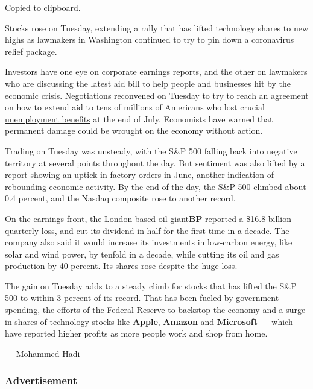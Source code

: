 Copied to clipboard.

Stocks rose on Tuesday, extending a rally that has lifted technology
shares to new highs as lawmakers in Washington continued to try to pin
down a coronavirus relief package.

Investors have one eye on corporate earnings reports, and the other on
lawmakers who are discussing the latest aid bill to help people and
businesses hit by the economic crisis. Negotiations reconvened on
Tuesday to try to reach an agreement on how to extend aid to tens of
millions of Americans who lost crucial
\href{https://www.nytimes3xbfgragh.onion/2020/07/30/business/unemployment-payments-change.html}{unemployment
benefits} at the end of July. Economists have warned that permanent
damage could be wrought on the economy without action.

Trading on Tuesday was unsteady, with the S\&P 500 falling back into
negative territory at several points throughout the day. But sentiment
was also lifted by a report showing an uptick in factory orders in June,
another indication of rebounding economic activity. By the end of the
day, the S\&P 500 climbed about 0.4 percent, and the Nasdaq composite
rose to another record.

On the earnings front, the
\href{https://www.nytimes3xbfgragh.onion/live/2020/08/04/business/stock-market-today-coronavirus/bp-to-step-up-renewable-investment-as-it-reports-a-huge-loss}{London-based
oil
giant}\textbf{\href{https://www.nytimes3xbfgragh.onion/live/2020/08/04/business/stock-market-today-coronavirus/bp-to-step-up-renewable-investment-as-it-reports-a-huge-loss}{BP}}
reported a \$16.8 billion quarterly loss, and cut its dividend in half
for the first time in a decade. The company also said it would increase
its investments in low-carbon energy, like solar and wind power, by
tenfold in a decade, while cutting its oil and gas production by 40
percent. Its shares rose despite the huge loss.

The gain on Tuesday adds to a steady climb for stocks that has lifted
the S\&P 500 to within 3 percent of its record. That has been fueled by
government spending, the efforts of the Federal Reserve to backstop the
economy and a surge in shares of technology stocks like \textbf{Apple},
\textbf{Amazon} and \textbf{Microsoft} --- which have reported higher
profits as more people work and shop from home.

--- Mohammed Hadi

\hypertarget{advertisement-2}{%
\subsubsection{Advertisement}\label{advertisement-2}}

